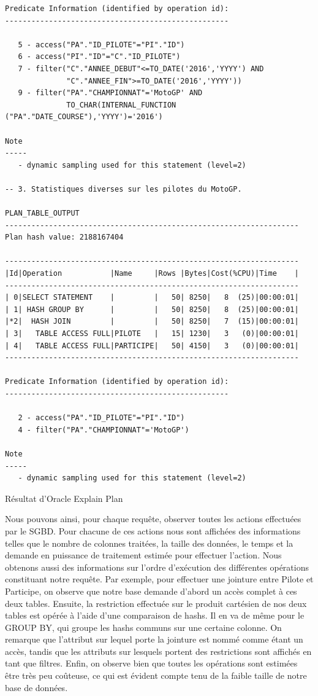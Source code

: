 \documentclass[12pt,a4paper]{article}
\newenvironment{code}{\captionsetup{type=listing}}{}
\begin{document}
\begin{code}
\begin{verbatim}
Predicate Information (identified by operation id):
---------------------------------------------------

   5 - access("PA"."ID_PILOTE"="PI"."ID")
   6 - access("PI"."ID"="C"."ID_PILOTE")
   7 - filter("C"."ANNEE_DEBUT"<=TO_DATE('2016','YYYY') AND
              "C"."ANNEE_FIN">=TO_DATE('2016','YYYY'))
   9 - filter("PA"."CHAMPIONNAT"='MotoGP' AND
              TO_CHAR(INTERNAL_FUNCTION ("PA"."DATE_COURSE"),'YYYY')='2016')

Note
-----
   - dynamic sampling used for this statement (level=2)
   
-- 3. Statistiques diverses sur les pilotes du MotoGP.

PLAN_TABLE_OUTPUT
-------------------------------------------------------------------
Plan hash value: 2188167404

-------------------------------------------------------------------
|Id|Operation           |Name     |Rows |Bytes|Cost(%CPU)|Time    |
-------------------------------------------------------------------
| 0|SELECT STATEMENT    |         |   50| 8250|   8  (25)|00:00:01|
| 1| HASH GROUP BY      |         |   50| 8250|   8  (25)|00:00:01|
|*2|  HASH JOIN         |         |   50| 8250|   7  (15)|00:00:01|
| 3|   TABLE ACCESS FULL|PILOTE   |   15| 1230|   3   (0)|00:00:01|
| 4|   TABLE ACCESS FULL|PARTICIPE|   50| 4150|   3   (0)|00:00:01|
-------------------------------------------------------------------

Predicate Information (identified by operation id):
---------------------------------------------------

   2 - access("PA"."ID_PILOTE"="PI"."ID")
   4 - filter("PA"."CHAMPIONNAT"='MotoGP')

Note
-----
   - dynamic sampling used for this statement (level=2)

    \end{verbatim}
    \caption{Résultat d'Oracle Explain Plan}
    \label{lst.expplan.res}
\end{code}

Nous pouvons ainsi, pour chaque requête, observer toutes les actions effectuées
par le SGBD. Pour chacune de ces actions nous sont affichées des informations telles
que le nombre de colonnes traitées, la taille des données, le temps et la
demande en puissance de traitement estimée pour effectuer l’action. Nous obtenons
aussi des informations sur l’ordre d’exécution des différentes opérations
constituant notre requête. Par exemple, pour effectuer une jointure entre Pilote
et Participe, on observe que notre base demande d’abord un accès complet à ces
deux tables. Ensuite, la restriction effectuée sur le produit cartésien de nos
deux tables est opérée à l’aide d’une comparaison de hashs. Il en va de même
pour le GROUP BY, qui groupe les hashs communs sur une certaine colonne. On
remarque que l'attribut sur lequel porte la jointure est nommé comme étant un
accès, tandis que les attributs sur lesquels portent des restrictions sont
affichés en tant que filtres. Enfin, on observe bien que toutes les opérations
sont estimées être très peu coûteuse, ce qui est évident compte tenu de la
faible taille de notre base de données.
\end{document}
